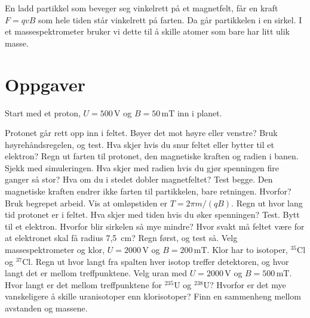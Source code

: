 \documentclass[11pt]{article}
\begin{document}

En ladd partikkel som beveger seg vinkelrett på et magnetfelt, får en kraft $F = qvB$ som hele tiden står vinkelrett på farten. Da går partikkelen i en sirkel. I et massespektrometer bruker vi dette til å skille atomer som bare har litt ulik masse.

\section*{Oppgaver}

Start med et proton, $U = 500\,\mathrm{V}$ og $B = 50\,\mathrm{mT}$ inn i planet.

\begin{oppgaveliste}
\oppgave {}Protonet går rett opp inn i feltet. Bøyer det mot høyre eller venstre? Bruk høyrehåndsregelen, og test. Hva skjer hvis du snur feltet eller bytter til et elektron?
\svar
\oppgave {}Regn ut farten til protonet, den magnetiske kraften og radien i banen. Sjekk med simuleringen.
\svar
\oppgave {}Hva skjer med radien hvis du gjør spenningen fire ganger så stor? Hva om du i stedet dobler magnetfeltet? Test begge.
\svar
\oppgave {}Den magnetiske kraften endrer ikke farten til partikkelen, bare retningen. Hvorfor? Bruk begrepet arbeid.
\svar
\oppgave {}Vis at omløpstiden er $T = 2πm / (qB)$. Regn ut hvor lang tid protonet er i feltet. Hva skjer med tiden hvis du øker spenningen? Test.
\svar
\oppgave {}Bytt til et elektron. Hvorfor blir sirkelen så mye mindre? Hvor svakt må feltet være for at elektronet skal få radius 7,5~cm? Regn først, og test så.
\svar
\oppgave {}Velg massespektrometer og klor, $U = 2000\,\mathrm{V}$ og $B = 200\,\mathrm{mT}$. Klor har to isotoper, ${}^{35}\mathrm{Cl}$ og ${}^{37}\mathrm{Cl}$. Regn ut hvor langt fra spalten hver isotop treffer detektoren, og hvor langt det er mellom treffpunktene.
\svar
\oppgave {}Velg uran med $U = 2000\,\mathrm{V}$ og $B = 500\,\mathrm{mT}$. Hvor langt er det mellom treffpunktene for ${}^{235}\mathrm{U}$ og ${}^{238}\mathrm{U}$? Hvorfor er det mye vanskeligere å skille uranisotoper enn klorisotoper? Finn en sammenheng mellom avstanden og massene.
\svar
\end{oppgaveliste}
\end{document}
